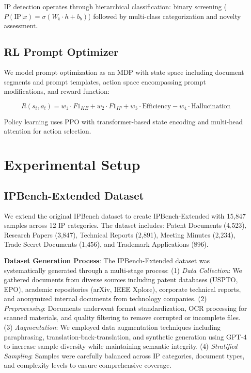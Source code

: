 \documentclass[11pt,a4paper]{article}
\begin{document}
IP detection operates through hierarchical classification: binary screening ($P(\text{IP}|x) = \sigma(W_b \cdot h + b_b)$) followed by multi-class categorization and novelty assessment.

\subsection{RL Prompt Optimizer}

We model prompt optimization as an MDP with state space including document segments and prompt templates, action space encompassing prompt modifications, and reward function:

\begin{equation}
R(s_t, a_t) = w_1 \cdot F1_{KE} + w_2 \cdot F1_{IP} + w_3 \cdot \text{Efficiency} - w_4 \cdot \text{Hallucination}
\end{equation}

Policy learning uses PPO \citep{schulman2017proximal} with transformer-based state encoding and multi-head attention for action selection.

\section{Experimental Setup}

\subsection{IPBench-Extended Dataset}

We extend the original IPBench dataset \citep{wang2025ipbench} to create IPBench-Extended with 15,847 samples across 12 IP categories. The dataset includes: Patent Documents (4,523), Research Papers (3,847), Technical Reports (2,891), Meeting Minutes (2,234), Trade Secret Documents (1,456), and Trademark Applications (896).

\textbf{Dataset Generation Process}: The IPBench-Extended dataset was systematically generated through a multi-stage process: (1) \textit{Data Collection}: We gathered documents from diverse sources including patent databases (USPTO, EPO), academic repositories (arXiv, IEEE Xplore), corporate technical reports, and anonymized internal documents from technology companies. (2) \textit{Preprocessing}: Documents underwent format standardization, OCR processing for scanned materials, and quality filtering to remove corrupted or incomplete files. (3) \textit{Augmentation}: We employed data augmentation techniques including paraphrasing, translation-back-translation, and synthetic generation using GPT-4 to increase sample diversity while maintaining semantic integrity. (4) \textit{Stratified Sampling}: Samples were carefully balanced across IP categories, document types, and complexity levels to ensure comprehensive coverage.
\end{document}
